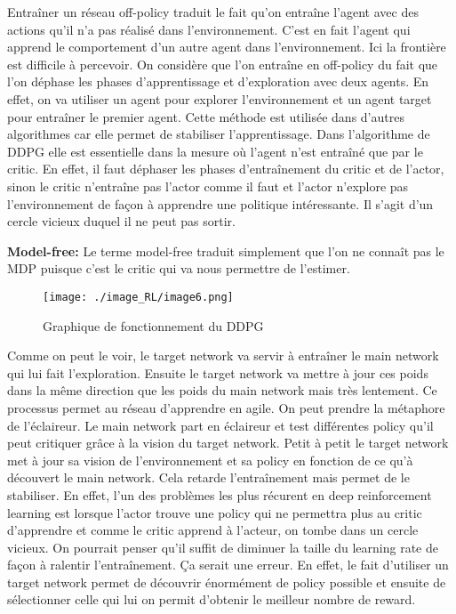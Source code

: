 Entraîner un réseau off-policy traduit le fait qu’on entraîne l’agent avec des actions qu’il n’a pas réalisé dans l’environnement. C’est en fait l’agent qui apprend le comportement d’un autre agent dans l’environnement.
Ici la frontière est difficile à percevoir. 
On considère que l’on entraîne en off-policy du fait que l’on déphase les phases d’apprentissage et d’exploration avec deux agents.
En effet, on va utiliser un agent pour explorer l’environnement et un agent target pour entraîner le premier agent.
Cette méthode est utilisée dans d’autres algorithmes car elle permet de stabiliser l’apprentissage.
Dans l’algorithme de DDPG elle est essentielle dans la mesure où l’agent n’est entraîné que par le critic.
En effet, il faut déphaser les phases d’entraînement du critic et de l’actor, sinon le critic n’entraîne pas l’actor comme il faut et l’actor n’explore pas l’environnement de façon à apprendre une politique intéressante. Il s’agit d’un cercle vicieux duquel il ne peut pas sortir.

\textbf{Model-free:}
Le terme model-free traduit simplement que l’on ne connaît pas le MDP puisque c’est le critic qui va nous permettre de l’estimer.


\begin{figure}[H]
    \centering
    \texttt{[image: ./image\_RL/image6.png]}
    \caption{  Graphique de fonctionnement du DDPG  }
\end{figure}

Comme on peut le voir, le target network va servir à entraîner le main network qui lui fait l’exploration. Ensuite le target network va mettre à jour ces poids dans la même direction que les poids du main network mais très lentement. Ce processus permet au réseau d’apprendre en agile. On peut prendre la métaphore de l’éclaireur. Le main network part en éclaireur et test différentes policy qu’il peut critiquer grâce à la vision du target network.
Petit à petit le target network met à jour sa vision de l’environnement et sa policy en fonction de ce qu’à découvert le main network.
Cela retarde l’entraînement mais permet de le stabiliser. En effet, l’un des problèmes les plus récurent en deep reinforcement learning est lorsque l’actor trouve une policy qui ne permettra plus au critic d’apprendre et comme le critic apprend à l’acteur, on tombe dans un cercle vicieux.
On pourrait penser qu’il suffit de diminuer la taille du learning rate de façon à ralentir l’entraînement. Ça serait une erreur.
En effet, le fait d’utiliser un target network permet de découvrir énormément de policy possible et ensuite de sélectionner celle qui lui on permit d’obtenir le meilleur nombre de reward.
